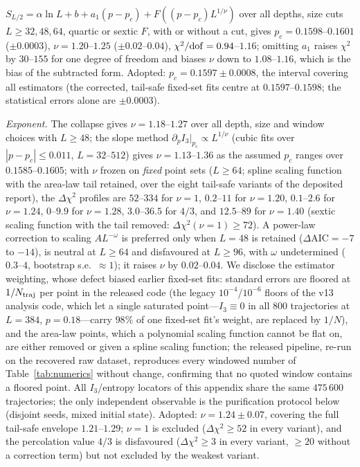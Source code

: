 \documentclass[aps,prx,reprint,superscriptaddress,nobibnotes,longbibliography]{revtex4-2}
\theoremstyle{remark}
\begin{document}
$S_{L/2}=\alpha\ln L+b+a_1(p-p_c)+F((p-p_c)L^{1/\nu})$ over all depths, size cuts $L\ge32,48,64$, quartic or sextic $F$, with or without a cut, gives $p_c=0.1598$--$0.1601$ ($\pm0.0003$), $\nu=1.20$--$1.25$ ($\pm0.02$--$0.04$), $\chi^2/{\rm dof}=0.94$--$1.16$; omitting $a_1$ raises $\chi^2$ by $30$--$155$ for one degree of freedom and biases $\nu$ down to $1.08$--$1.16$, which is the bias of the subtracted form.  Adopted: $p_c=0.1597\pm0.0008$, the interval covering all estimators (the corrected, tail-safe fixed-set fits centre at $0.1597$--$0.1598$; the statistical errors alone are $\pm0.0003$).

\emph{Exponent.}  The collapse gives $\nu=1.18$--$1.27$ over all depth, size and window choices with $L\ge48$; the slope method $\partial_pI_3|_{p_c}\propto L^{1/\nu}$ (cubic fits over $|p-p_c|\le0.011$, $L=32$--$512$) gives $\nu=1.13$--$1.36$ as the assumed $p_c$ ranges over $0.1585$--$0.1605$; with $\nu$ frozen on \emph{fixed} point sets ($L\ge64$; spline scaling function with the area-law tail retained, over the eight tail-safe variants of the deposited report), the $\Delta\chi^2$ profiles are $52$--$334$ for $\nu=1$, $0.2$--$11$ for $\nu=1.20$, $0.1$--$2.6$ for $\nu=1.24$, $0$--$9.9$ for $\nu=1.28$, $3.0$--$36.5$ for $4/3$, and $12.5$--$89$ for $\nu=1.40$ (sextic scaling function with the tail removed: $\Delta\chi^2(\nu=1)\ge72$).  A power-law correction to scaling $AL^{-\omega}$ is preferred only when $L=48$ is retained ($\Delta\mathrm{AIC}=-7$ to $-14$), is neutral at $L\ge64$ and disfavoured at $L\ge96$, with $\omega$ undetermined ($0.3$--$4$, bootstrap s.e.\ $\approx1$); it raises $\nu$ by $0.02$--$0.04$.  We disclose the estimator weighting, whose defect biased earlier fixed-set fits: standard errors are floored at $1/N_{\rm traj}$ per point in the released code (the legacy $10^{-4}$/$10^{-6}$ floors of the v13 analysis code, which let a single saturated point---$I_3\equiv0$ in all $800$ trajectories at $L=384$, $p=0.18$---carry $98\%$ of one fixed-set fit's weight, are replaced by $1/N$), and the area-law points, which a polynomial scaling function cannot be flat on, are either removed or given a spline scaling function; the released pipeline, re-run on the recovered raw dataset, reproduces every windowed number of Table~\ref{tab:numerics} without change, confirming that no quoted window contains a floored point.  All $I_3$/entropy locators of this appendix share the same $475\,600$ trajectories; the only independent observable is the purification protocol below (disjoint seeds, mixed initial state).  Adopted: $\nu=1.24\pm0.07$, covering the full tail-safe envelope $1.21$--$1.29$; $\nu=1$ is excluded ($\Delta\chi^2\ge52$ in every variant), and the percolation value $4/3$ is disfavoured ($\Delta\chi^2\ge3$ in every variant, $\ge20$ without a correction term) but not excluded by the weakest variant.
\end{document}
